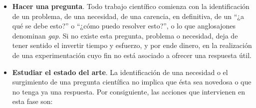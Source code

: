 \begin{itemize}
    \item \textbf{Hacer una pregunta}. Todo trabajo científico comienza con la identificación de un problema, de una necesidad, de una carencia, en definitiva, de un ``¿a qué se debe esto?'' o ``¿cómo puedo resolver esto?'', o lo que anglosajones denominan \textit{gap}. Si no existe esta pregunta, problema o necesidad, deja de tener sentido el invertir tiempo y esfuerzo, y por ende dinero, en la realización de una experimentación cuyo fin no está asociado a ofrecer una respuesta útil.

    \item \textbf{Estudiar el estado del arte}. La identificación de una necesidad o el surgimiento de una pregunta científica no implica que ésta sea novedosa o que no tenga ya una respuesta. Por consiguiente, las acciones que intervienen en esta fase son: 


\end{itemize}
